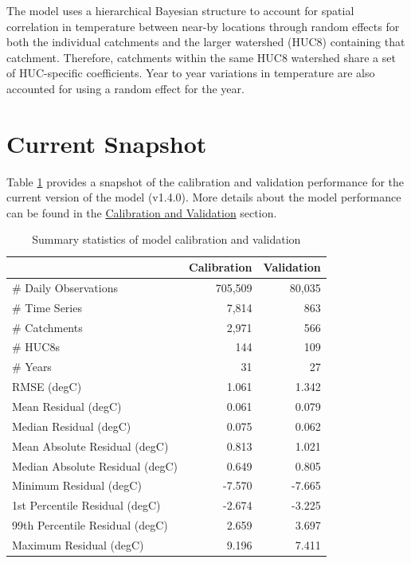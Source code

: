 \documentclass[
]{book}
\begin{document}
The model uses a hierarchical Bayesian structure to account for spatial correlation in temperature between near-by locations through random effects for both the individual catchments and the larger watershed (HUC8) containing that catchment. Therefore, catchments within the same HUC8 watershed share a set of HUC-specific coefficients. Year to year variations in temperature are also accounted for using a random effect for the year.

\section{Current Snapshot}\label{current-snapshot}

Table \ref{tab:table-intro-gof} provides a snapshot of the calibration and validation performance for the current version of the model (v1.4.0). More details about the model performance can be found in the \hyperref[calibration-and-validation]{Calibration and Validation} section.

\begin{table}

\caption{\label{tab:table-intro-gof}Summary statistics of model calibration and validation}
\centering
\begin{tabular}[t]{l|r|r}
\hline
 & Calibration & Validation\\
\hline
\# Daily Observations & 705,509 & 80,035\\
\hline
\# Time Series & 7,814 & 863\\
\hline
\# Catchments & 2,971 & 566\\
\hline
\# HUC8s & 144 & 109\\
\hline
\# Years & 31 & 27\\
\hline
RMSE (degC) & 1.061 & 1.342\\
\hline
Mean Residual (degC) & 0.061 & 0.079\\
\hline
Median Residual (degC) & 0.075 & 0.062\\
\hline
Mean Absolute Residual (degC) & 0.813 & 1.021\\
\hline
Median Absolute Residual (degC) & 0.649 & 0.805\\
\hline
Minimum Residual (degC) & -7.570 & -7.665\\
\hline
1st Percentile Residual (degC) & -2.674 & -3.225\\
\hline
99th Percentile Residual (degC) & 2.659 & 3.697\\
\hline
Maximum Residual (degC) & 9.196 & 7.411\\
\hline
\end{tabular}
\end{table}
\end{document}
